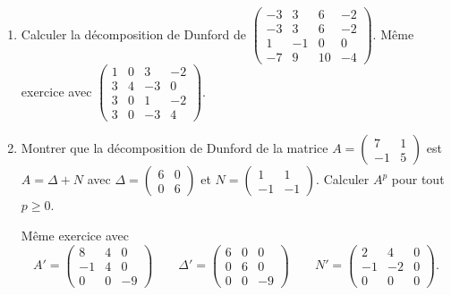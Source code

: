 \documentclass[12pt, class=report,crop=false]{standalone}
\begin{document}
\begin{miniexercices}
\begin{enumerate}
  
\item Calculer la décomposition de Dunford de 
$\left(\begin{smallmatrix}
-3 & 3 & 6 & -2 \\
-3 & 3 & 6 & -2 \\
1 & -1 & 0 & 0 \\
-7 & 9 & 10 & -4
  \end{smallmatrix}\right)$.
  Même exercice avec
 $\left(\begin{smallmatrix}
 1 & 0 & 3 & -2 \\
3 & 4 & -3 & 0 \\
3 & 0 & 1 & -2 \\
3 & 0 & -3 & 4
  \end{smallmatrix}\right)$.
  
  
  
  
  \item Montrer que la décomposition de Dunford de la matrice
$A = \left(\begin{smallmatrix}
7 & 1 \\
-1 & 5
  \end{smallmatrix}\right)$
  est $A = \Delta + N$ avec
  $\Delta = \left(\begin{smallmatrix}
6 & 0 \\
0 & 6
  \end{smallmatrix}\right)$
  et $N = \left(\begin{smallmatrix}
1 & 1 \\
-1 & -1
  \end{smallmatrix}\right)$.
  Calculer $A^p$ pour tout $p\ge0$. 
  
  Même exercice avec 
  $$A' = \left(\begin{smallmatrix}
8 & 4 & 0 \\
-1 & 4 & 0 \\
0 & 0 & -9
  \end{smallmatrix}\right)\qquad
\Delta' =  \left(\begin{smallmatrix}
6 & 0 & 0 \\
0 & 6 & 0 \\
0 & 0 & -9
  \end{smallmatrix}\right) \qquad
N' = \left(\begin{smallmatrix}
2 & 4 & 0 \\
-1 & -2 & 0 \\
0 & 0 & 0
  \end{smallmatrix}\right).  
  $$
\end{enumerate}
\end{miniexercices}
\end{document}
